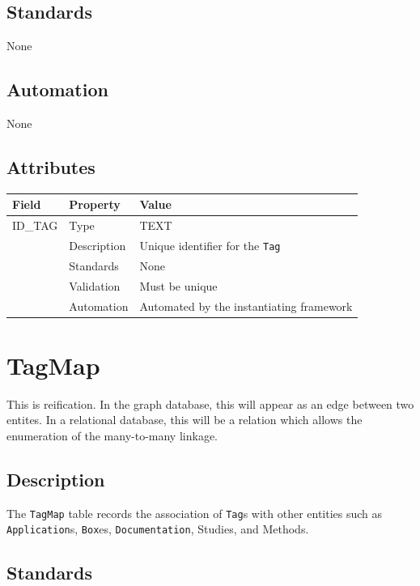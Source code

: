 \documentclass[
]{article}
\newcounter{none}
\begin{document}
\subsection{Standards}\label{standards-35}

None

\subsection{Automation}\label{automation-35}

None

\subsection{Attributes}\label{attributes-30}

{\def\LTcaptype{none} 
\begin{longtable}[]{@{}lll@{}}
\toprule\noalign{}
Field & Property & Value \\
\midrule\noalign{}
\endhead
\bottomrule\noalign{}
\endlastfoot
ID\_TAG & Type & TEXT \\
& Description & Unique identifier for the \texttt{Tag} \\
& Standards & None \\
& Validation & Must be unique \\
& Automation & Automated by the instantiating framework \\
\end{longtable}
}

\section{TagMap}\label{tagmap}

This is reification. In the graph database, this will appear as an edge
between two entites. In a relational database, this will be a relation
which allows the enumeration of the many-to-many linkage.

\subsection{Description}\label{description-34}

The \texttt{TagMap} table records the association of \texttt{Tag}s with
other entities such as \texttt{Application}s, \texttt{Box}es,
\texttt{Documentation}, Studies, and Methods.

\subsection{Standards}\label{standards-36}
\end{document}

